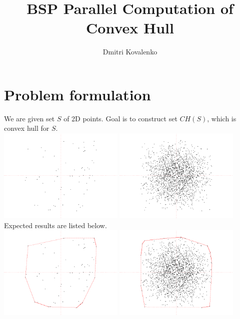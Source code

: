 \documentclass[a4paper]{article}
\begin{document}
\title {BSP Parallel Computation of Convex Hull}
\author {Dmitri Kovalenko}

\maketitle
\section {Problem formulation}
    We are given set $S$ of 2D points. Goal is to construct set $CH(S)$, which is convex hull for $S$.\\
    \includegraphics [width=0.45\textwidth] {plain_points.png}
    \includegraphics [width=0.45\textwidth] {plain_points_b.png}\\
    Expected results are listed below.\\
    \includegraphics [width=0.45\textwidth] {final_hull.png}
    \includegraphics [width=0.45\textwidth] {final_hull_b.png}\\
\end{document}
